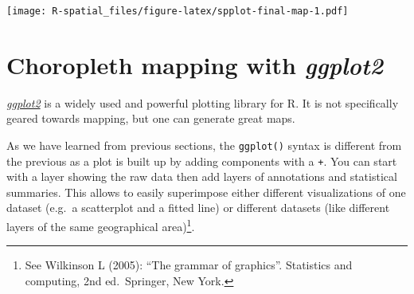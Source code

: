 \documentclass[
  11pt,
]{book}
\newenvironment{Shaded}{\begin{snugshade}}{\end{snugshade}}
\newcommand{\AttributeTok}[1]{\textcolor[rgb]{0.77,0.63,0.00}{#1}}
\newcommand{\CommentTok}[1]{\textcolor[rgb]{0.56,0.35,0.01}{\textit{#1}}}
\newcommand{\DecValTok}[1]{\textcolor[rgb]{0.00,0.00,0.81}{#1}}
\newcommand{\FloatTok}[1]{\textcolor[rgb]{0.00,0.00,0.81}{#1}}
\newcommand{\FunctionTok}[1]{\textcolor[rgb]{0.00,0.00,0.00}{#1}}
\newcommand{\NormalTok}[1]{#1}
\newcommand{\OtherTok}[1]{\textcolor[rgb]{0.56,0.35,0.01}{#1}}
\newcommand{\SpecialCharTok}[1]{\textcolor[rgb]{0.00,0.00,0.00}{#1}}
\newcommand{\StringTok}[1]{\textcolor[rgb]{0.31,0.60,0.02}{#1}}
\begin{document}
\begin{Shaded}
\end{Shaded}

\texttt{[image: R-spatial\_files/figure-latex/spplot-final-map-1.pdf]}

\hypertarget{choropleth-mapping-with-ggplot2}{%
\section{\texorpdfstring{Choropleth mapping with \emph{ggplot2}}{Choropleth mapping with ggplot2}}\label{choropleth-mapping-with-ggplot2}}

\href{http://ggplot2.org/}{\emph{ggplot2}} is a widely used and powerful plotting library for R. It is not specifically geared towards mapping, but one can generate great maps.

As we have learned from previous sections, the \texttt{ggplot()} syntax is different from the previous as a plot is built up by adding components with a \texttt{+}. You can start with a layer showing the raw data then add layers of annotations and statistical summaries. This allows to easily superimpose either different visualizations of one dataset (e.g.~a scatterplot and a fitted line) or different datasets (like different layers of the same geographical area)\footnote{See Wilkinson L (2005): ``The grammar of graphics''. Statistics and computing, 2nd ed.~Springer, New York.}.
\end{document}
